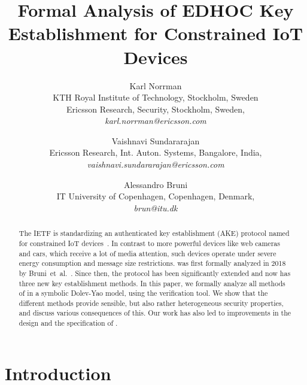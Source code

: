 \documentclass[runningheads, envcountsame, hidelinks, a4paper, x11names]{article}
\begin{document}
\title{Formal Analysis of EDHOC Key Establishment for Constrained IoT Devices}

\date{}


\author{Karl Norrman\\
    KTH Royal Institute of Technology, Stockholm, Sweden\\
    Ericsson Research, Security, Stockholm, Sweden,\\
    \emph{karl.norrman@ericsson.com}
\and
    Vaishnavi Sundararajan\\
    Ericsson Research, Int. Auton. Systems, Bangalore, India,\\
    \emph{vaishnavi.sundararajan@ericsson.com}
\and
    Alessandro Bruni\\
    IT University of Copenhagen, Copenhagen, Denmark,\\
    \emph{brun@itu.dk}
}

%
\maketitle
%

\begin{abstract}
The IETF is standardizing an authenticated key establishment (AKE) protocol
named \mEdhoc{} for constrained IoT devices~\cite{selander-lake-edhoc-01}.
%
In contrast to more powerful devices like web cameras and cars, which receive a
lot of media attention, such devices operate under severe energy consumption
and message size restrictions.
%
\mEdhoc{} was first formally analyzed in 2018 by
Bruni~et~al.~\cite{DBLP:conf/secsr/BruniJPS18}.
%
Since then, the protocol has been significantly extended and now has three new
key establishment methods.
%
In this paper, we formally analyze all methods of \mEdhoc{} in a symbolic
Dolev-Yao model, using the \mTamarin{} verification tool.
%
We show that the different methods provide sensible, but also rather
heterogeneous security properties, and discuss various consequences of this.
%
Our work has also led to improvements in the design and the specification of
\mEdhoc.
%
\end{abstract}
%


\section{Introduction}
\label{sec:introduction}
\end{document}
